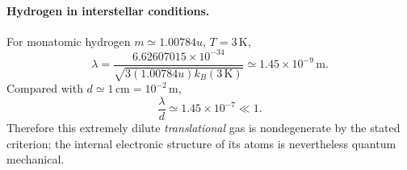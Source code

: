 \paragraph{Hydrogen in interstellar conditions.}
For monatomic hydrogen $m\simeq1.00784u$, $T=3\,\mathrm K$,
\begin{equation}
\lambda=\frac{6.62607015\times10^{-34}}
{\sqrt{3(1.00784u)k_B(3\,\mathrm K)}}
\simeq\boxed{1.45\times10^{-9}\,\mathrm m}.
\end{equation}
Compared with $d\simeq1\,\mathrm{cm}=10^{-2}\,\mathrm m$,
\begin{equation}
\boxed{\frac{\lambda}{d}\simeq1.45\times10^{-7}\ll1}.
\end{equation}
Therefore this extremely dilute \emph{translational} gas is nondegenerate by the stated criterion; the internal electronic structure of its atoms is nevertheless quantum mechanical.
